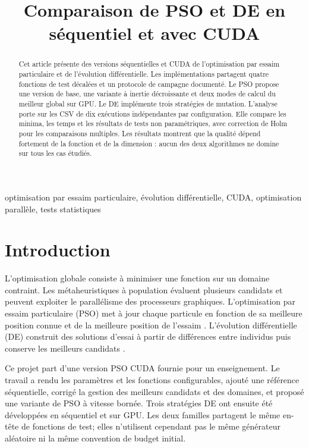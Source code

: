\documentclass[conference]{IEEEtran}
\title{Comparaison de PSO et DE en séquentiel et avec CUDA}
\author{
\IEEEauthorblockN{Abdelmalek Nourine}
\IEEEauthorblockA{Université de Haute-Alsace, France}
\and
\IEEEauthorblockN{Rania Mamouc}
\IEEEauthorblockA{Université de Haute-Alsace, France}
}
\newcommand{\PSO}{\textsc{PSO}}
\newcommand{\DE}{\textsc{DE}}
\begin{document}
\maketitle

\begin{abstract}
Cet article présente des versions séquentielles et CUDA de l'optimisation par
essaim particulaire et de l'évolution différentielle. Les implémentations
partagent quatre fonctions de test décalées et un protocole de campagne
documenté. Le PSO propose une version de base, une variante à inertie
décroissante et deux modes de calcul du meilleur global sur GPU. Le DE
implémente trois stratégies de mutation. L'analyse porte sur les CSV de dix
exécutions indépendantes par configuration. Elle compare les minima, les
temps et les résultats de tests non paramétriques, avec correction de Holm
pour les comparaisons multiples. Les résultats montrent que la qualité dépend
fortement de la fonction et de la dimension : aucun des deux algorithmes ne
domine sur tous les cas étudiés.
\end{abstract}

\begin{IEEEkeywords}
optimisation par essaim particulaire, évolution différentielle, CUDA,
optimisation parallèle, tests statistiques
\end{IEEEkeywords}

\section{Introduction}
\label{sec:introduction}

L'optimisation globale consiste à minimiser une fonction sur un domaine
contraint. Les métaheuristiques à population évaluent plusieurs candidats et
peuvent exploiter le parallélisme des processeurs graphiques. L'optimisation
par essaim particulaire (\PSO) met à jour chaque particule en fonction de sa
meilleure position connue et de la meilleure position de l'essaim
\cite{kennedy1995pso}. L'évolution différentielle (\DE) construit des
solutions d'essai à partir de différences entre individus puis conserve les
meilleurs candidats \cite{storn1997de}.

Ce projet part d'une version \PSO{} CUDA fournie pour un enseignement. Le
travail a rendu les paramètres et les fonctions configurables, ajouté une
référence séquentielle, corrigé la gestion des meilleurs candidats et des
domaines, et proposé une variante de \PSO{} à vitesse bornée. Trois stratégies
\DE{} ont ensuite été développées en séquentiel et sur GPU. Les deux familles
partagent le même en-tête de fonctions de test; elles n'utilisent cependant
pas le même générateur aléatoire ni la même convention de budget initial.
\end{document}
